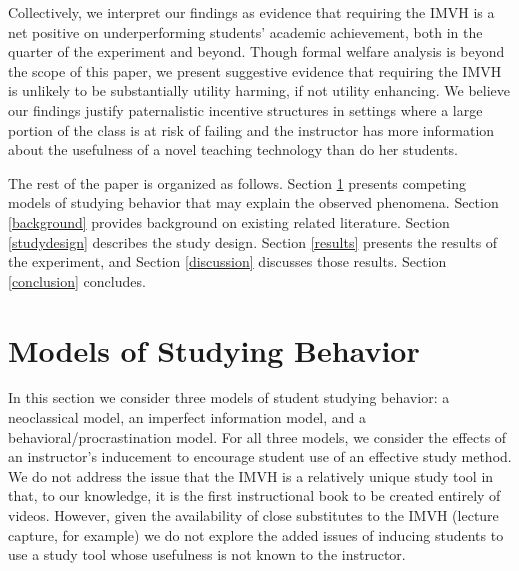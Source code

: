 \documentclass[12pt]{article}
\begin{document}
Collectively, we interpret our findings as evidence that requiring the IMVH is a net positive on underperforming students' academic achievement, both in the quarter of the experiment and beyond. Though formal welfare analysis is beyond the scope of this paper, we present suggestive evidence that requiring the IMVH is unlikely to be substantially utility harming, if not utility enhancing. We believe our findings justify paternalistic incentive structures in settings where a large portion of the class is at risk of failing and the instructor has more information about the usefulness of a novel teaching technology than do her students.


The rest of the paper is organized as follows. Section \ref{models} presents competing models of studying behavior that may explain the observed phenomena. Section \ref{background} provides background on existing related literature. Section \ref{studydesign} describes the study design. Section \ref{results} presents the results of the experiment, and Section \ref{discussion} discusses those results. Section \ref{conclusion} concludes.


\section{Models of Studying Behavior} \label{models}

In this section we consider three models of student studying behavior: a neoclassical model, an imperfect information model, and a behavioral/procrastination model. For all three models, we consider the effects of an instructor's inducement to encourage student use of an effective study method. We do not address the issue that the IMVH is a relatively unique study tool in that, to our knowledge, it is the first instructional book to be created entirely of videos. However, given the availability of close substitutes to the IMVH (lecture capture, for example) we do not explore the added issues of inducing students to use a study tool whose usefulness is not known to the instructor.
\end{document}
